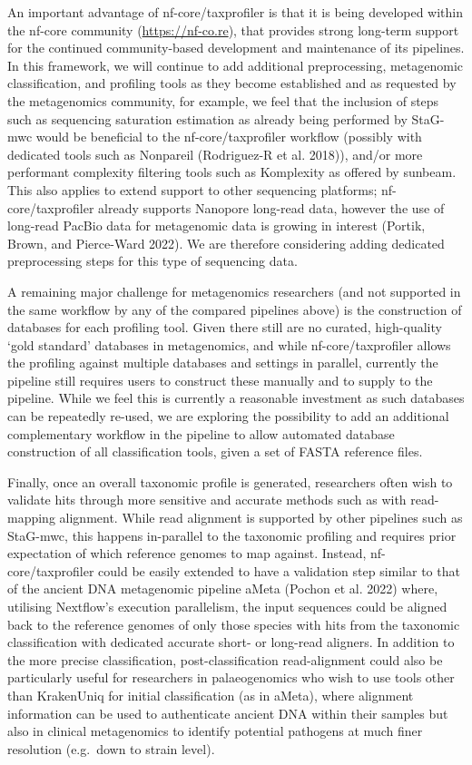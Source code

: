 \documentclass[
]{article}
\begin{document}
An important advantage of nf-core/taxprofiler is that it is being
developed within the nf-core community (\url{https://nf-co.re}), that
provides strong long-term support for the continued community-based
development and maintenance of its pipelines. In this framework, we will
continue to add additional preprocessing, metagenomic classification,
and profiling tools as they become established and as requested by the
metagenomics community, for example, we feel that the inclusion of steps
such as sequencing saturation estimation as already being performed by
StaG-mwc would be beneficial to the nf-core/taxprofiler workflow
(possibly with dedicated tools such as Nonpareil (Rodriguez-R et al.
2018)), and/or more performant complexity filtering tools such as
Komplexity as offered by sunbeam. This also applies to extend support to
other sequencing platforms; nf-core/taxprofiler already supports
Nanopore long-read data, however the use of long-read PacBio data for
metagenomic data is growing in interest (Portik, Brown, and Pierce-Ward
2022). We are therefore considering adding dedicated preprocessing steps
for this type of sequencing data.

A remaining major challenge for metagenomics researchers (and not
supported in the same workflow by any of the compared pipelines above)
is the construction of databases for each profiling tool. Given there
still are no curated, high-quality `gold standard' databases in
metagenomics, and while nf-core/taxprofiler allows the profiling against
multiple databases and settings in parallel, currently the pipeline
still requires users to construct these manually and to supply to the
pipeline. While we feel this is currently a reasonable investment as
such databases can be repeatedly re-used, we are exploring the
possibility to add an additional complementary workflow in the pipeline
to allow automated database construction of all classification tools,
given a set of FASTA reference files.

Finally, once an overall taxonomic profile is generated, researchers
often wish to validate hits through more sensitive and accurate methods
such as with read-mapping alignment. While read alignment is supported
by other pipelines such as StaG-mwc, this happens in-parallel to the
taxonomic profiling and requires prior expectation of which reference
genomes to map against. Instead, nf-core/taxprofiler could be easily
extended to have a validation step similar to that of the ancient DNA
metagenomic pipeline aMeta (Pochon et al. 2022) where, utilising
Nextflow's execution parallelism, the input sequences could be aligned
back to the reference genomes of only those species with hits from the
taxonomic classification with dedicated accurate short- or long-read
aligners. In addition to the more precise classification,
post-classification read-alignment could also be particularly useful for
researchers in palaeogenomics who wish to use tools other than
KrakenUniq for initial classification (as in aMeta), where alignment
information can be used to authenticate ancient DNA within their samples
but also in clinical metagenomics to identify potential pathogens at
much finer resolution (e.g.~down to strain level).
\end{document}
